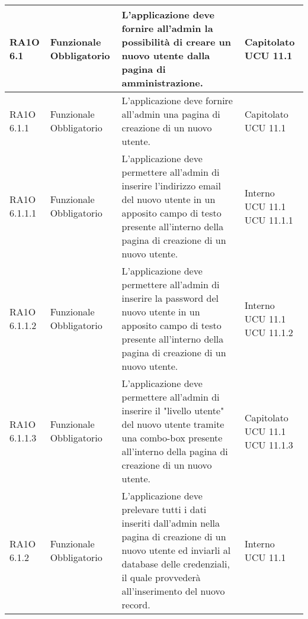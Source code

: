 \begin{center}
\begin{longtable}{ | l | p{2cm} | p{5cm} | p{1.7cm} |}
        RA1O 6.1 & Funzionale \newline  Obbligatorio  & L'applicazione deve fornire all'admin la possibilità  di creare un nuovo utente dalla pagina di amministrazione. &  Capitolato \newline  UCU 11.1 \newline  \\ \hline      
        RA1O 6.1.1 & Funzionale \newline  Obbligatorio  & L'applicazione deve fornire all'admin una pagina di creazione di un nuovo utente. &  Capitolato \newline  UCU 11.1 \newline  \\ \hline      
        RA1O 6.1.1.1 & Funzionale \newline  Obbligatorio  & L'applicazione deve permettere all'admin di inserire l'indirizzo email del nuovo utente in un apposito campo di testo presente all'interno della pagina di creazione di un nuovo utente.
 &  Interno \newline  UCU 11.1 \newline  UCU 11.1.1 \newline  \\ \hline      
        RA1O 6.1.1.2 & Funzionale \newline  Obbligatorio  & L'applicazione deve permettere all'admin di inserire la password del nuovo utente in un apposito campo di testo presente all'interno della pagina di creazione di un nuovo utente. &  Interno \newline  UCU 11.1 \newline  UCU 11.1.2 \newline  \\ \hline      
        RA1O 6.1.1.3 & Funzionale \newline  Obbligatorio  & L'applicazione deve permettere all'admin di inserire il "livello utente" del nuovo utente tramite una combo-box presente all'interno della pagina di creazione di un nuovo utente. &  Capitolato \newline  UCU 11.1 \newline  UCU 11.1.3 \newline  \\ \hline      
        RA1O 6.1.2 & Funzionale \newline  Obbligatorio  & L'applicazione deve prelevare tutti i dati inseriti dall'admin nella pagina di creazione di un nuovo utente ed inviarli al database delle credenziali, il quale provvederà  all'inserimento del nuovo record. &  Interno \newline  UCU 11.1 \newline  \\ \hline      

\end{longtable}
\end{center}
